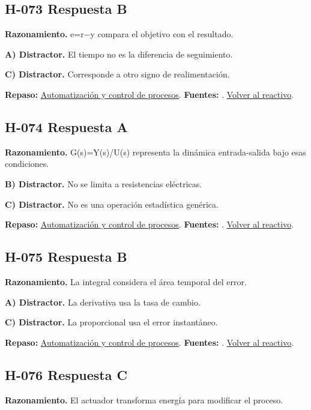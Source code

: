 \subsection*{H-073 \quad Respuesta B}\label{s:H-073}
\textbf{Razonamiento.} e=r−y compara el objetivo con el resultado.

\textbf{A) Distractor. }El tiempo no es la diferencia de seguimiento.

\textbf{C) Distractor. }Corresponde a otro signo de realimentación.

\textbf{Repaso:} \hyperref[sec:h4]{Automatización y control de procesos}. \textbf{Fuentes:} \cite{control,signals,pid}. \hyperref[q:H-073]{Volver al reactivo}.\par\medskip

\subsection*{H-074 \quad Respuesta A}\label{s:H-074}
\textbf{Razonamiento.} G(s)=Y(s)/U(s) representa la dinámica entrada-salida bajo esas condiciones.

\textbf{B) Distractor. }No se limita a resistencias eléctricas.

\textbf{C) Distractor. }No es una operación estadística genérica.

\textbf{Repaso:} \hyperref[sec:h4]{Automatización y control de procesos}. \textbf{Fuentes:} \cite{control,signals,pid}. \hyperref[q:H-074]{Volver al reactivo}.\par\medskip

\subsection*{H-075 \quad Respuesta B}\label{s:H-075}
\textbf{Razonamiento.} La integral considera el área temporal del error.

\textbf{A) Distractor. }La derivativa usa la tasa de cambio.

\textbf{C) Distractor. }La proporcional usa el error instantáneo.

\textbf{Repaso:} \hyperref[sec:h4]{Automatización y control de procesos}. \textbf{Fuentes:} \cite{control,signals,pid}. \hyperref[q:H-075]{Volver al reactivo}.\par\medskip

\subsection*{H-076 \quad Respuesta C}\label{s:H-076}
\textbf{Razonamiento.} El actuador transforma energía para modificar el proceso.

